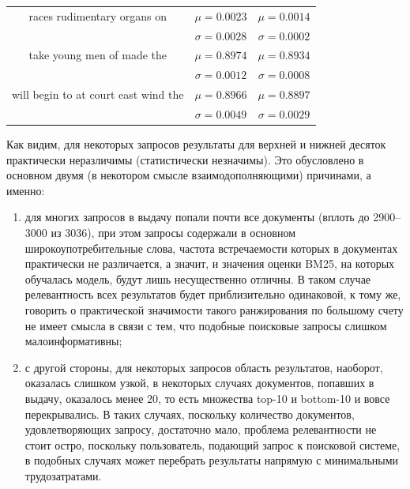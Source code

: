 \begin{table}[tbp]
\begin{center}
\begin{tabular}{ccc}
            \midrule
            races  rudimentary organs on              & \(\mu=0.0023\)                                    & \(\mu=0.0014\)              \\
                                                      & \(\sigma=0.0028\)                                 & \(\sigma=0.0002\)           \\
            \midrule
            take young men of made the                & \(\mu=0.8974\)                                    & \(\mu=0.8934\)              \\
                                                      & \(\sigma=0.0012\)                                 & \(\sigma=0.0008\)           \\
            \midrule
            will begin to at court east wind the      & \(\mu=0.8966\)                                    & \(\mu=0.8897\)              \\
                                                      & \(\sigma=0.0049\)                                 & \(\sigma=0.0029\)           \\
            \bottomrule
        \end{tabular}\label{tab5}
    \end{center}
\end{table}

Как видим, для некоторых запросов результаты для верхней и нижней десяток практически неразличимы (статистически незначимы).
Это обусловлено в основном двумя (в некотором смысле взаимодополняющими) причинами, а именно:
\begin{enumerate}[1)]
    \item для многих запросов в выдачу попали почти все документы (вплоть до 2900--3000 из 3036), при этом запросы содержали в основном 
          широкоупотребительные слова, частота встречаемости которых в документах практически не различается, а значит, и значения оценки BM25,
          на которых обучалась модель, будут лишь несущественно отличны. В таком случае релевантность всех результатов будет приблизительно 
          одинаковой, к тому же, говорить о практической значимости такого ранжирования по большому счету не имеет смысла в связи с тем,
          что подобные поисковые запросы слишком малоинформативны;
    \item с другой стороны, для некоторых запросов область результатов, наоборот, оказалась слишком узкой, в некоторых случаях документов,
          попавших в выдачу, оказалось менее 20, то есть множества top-10 и bottom-10 и вовсе перекрывались. В таких случаях, поскольку
          количество документов, удовлетворяющих запросу, достаточно мало, проблема релевантности не стоит остро, поскольку пользователь,
          подающий запрос к поисковой системе, в подобных случаях может перебрать результаты напрямую с минимальными трудозатратами.
\end{enumerate}

